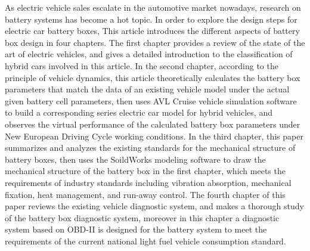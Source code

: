 \begin{englishabstract}

    As electric vehicle sales escalate in the automotive market nowadays, research on battery systems has become a hot topic. In order to explore the design steps for electric car battery boxes, This article introduces the different aspects of battery box design in four chapters. The first chapter provides a review of the state of the art of electric vehicles, and gives a detailed introduction to the classification of hybrid cars involved in this article. In the second chapter, according to the principle of vehicle dynamics, this article theoretically calculates the battery box parameters that match the data of an existing vehicle model under the actual given battery cell parameters, then uses AVL Cruise vehicle simulation software to build a corresponding series electric car model for hybrid vehicles, and observes the virtual performance of the calculated battery box parameters under New European Driving Cycle working conditions. In the third chapter, this paper summarizes and analyzes the existing standards for the mechanical structure of battery boxes, then uses the SoildWorks modeling software to draw the mechanical structure of the battery box in the first chapter, which meets the requirements of industry standards including vibration absorption, mechanical fixation, heat management, and run-away control. The fourth chapter of this paper reviews the existing vehicle diagnostic system, and makes a thorough study of the battery box diagnostic system, moreover in this chapter a diagnostic system based on OBD-II is designed for the battery system to meet the requirements of the current national light fuel vehicle consumption standard.
    
 
 \end{englishabstract}